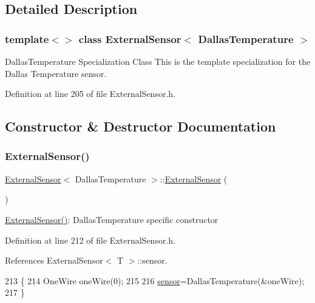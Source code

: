 \subsection{Detailed Description}
\subsubsection*{template$<$$>$\newline
class External\+Sensor$<$ Dallas\+Temperature $>$}

Dallas\+Temperature Specialization Class This is the template specialization for the Dallas Temperature sensor. 

Definition at line 205 of file External\+Sensor.\+h.



\subsection{Constructor \& Destructor Documentation}
\mbox{\label{classExternalSensor_3_01DallasTemperature_01_4_ad290681e8780cdf1870416eee99d699d}} 
\subsubsection{\texorpdfstring{External\+Sensor()}{ExternalSensor()}}
{\footnotesize\ttfamily \hyperlink{classExternalSensor}{External\+Sensor}$<$ Dallas\+Temperature $>$\+::\hyperlink{classExternalSensor}{External\+Sensor} (\begin{DoxyParamCaption}{ }\end{DoxyParamCaption})\hspace{0.3cm}{\ttfamily [inline]}}

\hyperlink{classExternalSensor_3_01DallasTemperature_01_4_ad290681e8780cdf1870416eee99d699d}{External\+Sensor()}\+: Dallas\+Temperature specific constructor 

Definition at line 212 of file External\+Sensor.\+h.



References External\+Sensor$<$ T $>$\+::sensor.


\begin{DoxyCode}
213     \{
214         OneWire oneWire(0);
215         
216         \hyperlink{classExternalSensor_3_01DallasTemperature_01_4_adb6ba4fcdedef95ad8f6b0c9b6c0f9d1}{sensor}=DallasTemperature(&oneWire);
217     \}
\end{DoxyCode}


